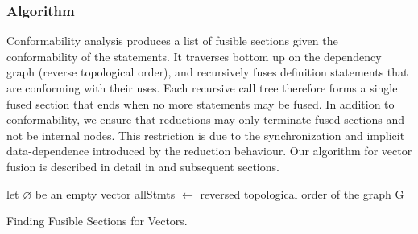 \subsubsection{Algorithm}

Conformability analysis produces a list of fusible sections given the conformability of
the statements. It traverses bottom up on the dependency graph (reverse topological order),
and recursively fuses definition statements that are conforming with their uses. Each
recursive call tree therefore forms a single fused section that ends when no more
statements may be fused. In addition to conformability, we ensure that reductions may
only terminate fused sections and not be internal nodes. This restriction is due to the
synchronization and implicit data-dependence introduced by the reduction behaviour.
Our algorithm for vector fusion is described in detail in 
and subsequent sections.

\begin{algorithm}[htbp]
\begin{small}
\SetAlgoLined
{}
let $\varnothing$ be an empty vector\;
allStmts $\gets$ reversed topological order of the graph G\;
\Fna{\Funca{A}}{
    \uIf{isNotVisited(A)}{
        setVisited(A)\;
        \uIf{isGroupE_Binary(A) or isGroupS(A)}{
            list $\gets$ fetchFusibleStmts(A, A.first.parent)\;
            list.append(fetchFusibleStmts(A, A.second.parent))\;
        }
        \uElseIf{isGroupE_Unary(A) or isGroupB(A)}{
            list $\gets$ fetchFusibleStmts(A, A.first.parent)\;
        }
        \uElseIf{isGroupX(A)}{
            list $\gets$ fetchFusibleStmts(A, A.second.parent)\;
        }
        \Else{
            list $\gets$ $\varnothing$\;
        }
        \Return{\{A\}.append(list)}
    }
    \Return $\varnothing$\;
}
\end{small}

\caption{Finding Fusible Sections for Vectors.} \label{algo:conformability}
\end{algorithm}

